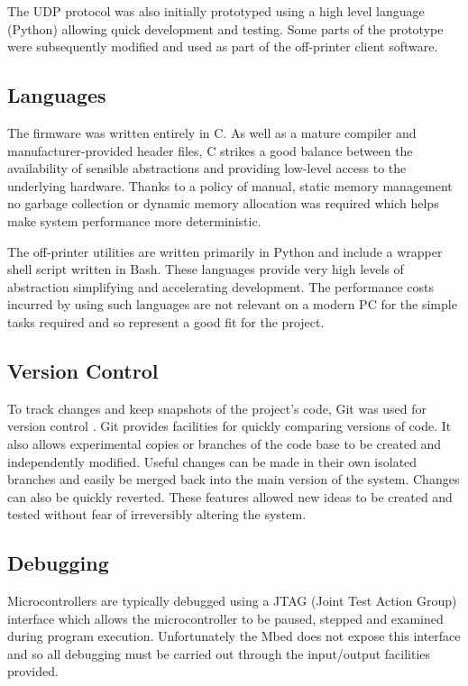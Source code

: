 			The UDP protocol was also initially prototyped using a high level language
			(Python) allowing quick development and testing. Some parts of the
			prototype were subsequently modified and used as part of the off-printer
			client software.
		
		
		\subsection{Languages}
			
			The firmware was written entirely in C. As well as a mature compiler and
			manufacturer-provided header files, C strikes a good balance between the
			availability of sensible abstractions and providing low-level access to
			the underlying hardware. Thanks to a policy of manual, static memory
			management no garbage collection or dynamic memory allocation was required
			which helps make system performance more deterministic.
			
			The off-printer utilities are written primarily in Python and include a
			wrapper shell script written in Bash. These languages provide very high
			levels of abstraction simplifying and accelerating development. The
			performance costs incurred by using such languages are not relevant on a
			modern PC for the simple tasks required and so represent a good fit for
			the project.
			
		\subsection{Version Control}
			
			To track changes and keep snapshots of the project's code, Git was used
			for version control \cite{git}. Git provides facilities for quickly
			comparing versions of code. It also allows experimental copies or branches
			of the code base to be created and independently modified. Useful changes
			can be made in their own isolated branches and easily be merged back into
			the main version of the system. Changes can also be quickly reverted.
			These features allowed new ideas to be created and tested without fear of
			irreversibly altering the system.
		
		\subsection{Debugging}
			
			Microcontrollers are typically debugged using a JTAG (Joint Test Action
			Group) interface which allows the microcontroller to be paused, stepped
			and examined during program execution. Unfortunately the Mbed does not
			expose this interface and so all debugging must be carried out through the
			input/output facilities provided.
			
